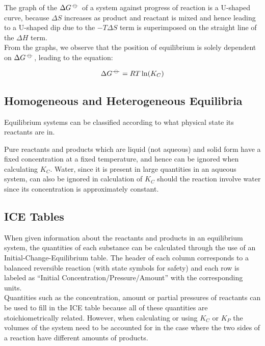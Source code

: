 \documentclass[../main]{subfiles}
\begin{document}
	The graph of the \(\Delta G^{-\kern-4pt{\ominus}\kern-4pt-}\) of a system against progress of reaction is a U-shaped curve, because \(\Delta S\) increases as product and reactant is mixed and hence leading to a U-shaped dip due to the \(- T \Delta S\) term is superimposed on the straight line of the \(\Delta H\) term. \\

	From the graphs, we observe that the position of equilibrium is solely dependent on \(\Delta G^{-\kern-4pt{\ominus}\kern-4pt-}\), leading to the equation: 

	\[ \Delta G^{-\kern-4pt{\ominus}\kern-4pt-} = R T \ln(K_C) \]

	\subsection{Homogeneous and Heterogeneous Equilibria}

	Equilibrium systems can be classified according to what physical state its reactants are in. \\



	Pure reactants and products which are liquid (not aqueous) and solid form have a fixed concentration at a fixed temperature, and hence can be ignored when calculating \(K_C\). Water, since it is present in large quantities in an aqueous system, can also be ignored in calculation of \(K_C\) should the reaction involve water since its concentration is approximately constant.

	\subsection{ICE Tables}

	When given information about the reactants and products in an equilibrium system, the quantities of each substance can be calculated through the use of an Initial-Change-Equilibrium table. The header of each column corresponds to a balanced reversible reaction (with state symbols for safety) and each row is labeled as ``Initial Concentration/Pressure/Amount'' with the corresponding units.\\

	Quantities such as the  concentration, amount or partial pressures of reactants can be used to fill in the ICE table because all of these quantities are stoichiometrically related. However, when calculating or using \(K_C\) or \(K_P\) the volumes of the system need to be accounted for in the case where the two sides of a reaction have different amounts of products. \\
\end{document}
